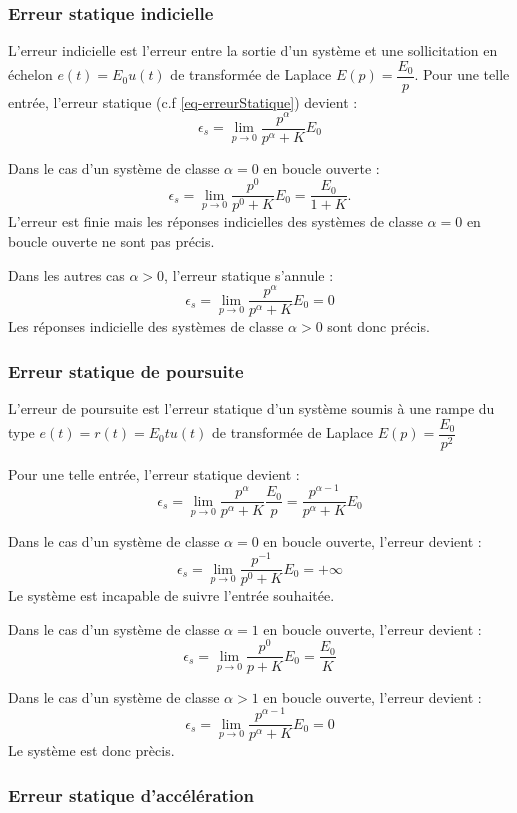 \subsubsection{Erreur statique indicielle}

L'erreur indicielle est l'erreur entre la sortie d'un système et une 
sollicitation en échelon $e(t)=E_0u(t)$ de transformée de Laplace 
$E(p)=\dfrac{E_0}{p}$. 
Pour une telle entrée, l'erreur statique (c.f \cref{eq-erreurStatique}) devient :
$$
\epsilon_s=\lim\limits_{p\to 0} \dfrac{p^\alpha}{p^\alpha+K}E_0
$$

Dans le cas d'un système de classe $\alpha=0$ en boucle ouverte :
$$
\epsilon_s=\lim\limits_{p\to 0} \dfrac{p^0}{p^0+K}E_0=\dfrac{E_0}{1+K}.
$$
L'erreur est finie mais les réponses indicielles des systèmes de classe 
$\alpha=0$ en boucle ouverte ne sont pas précis.

Dans les autres cas $\alpha>0$, l'erreur statique s'annule :
$$
\epsilon_s=\lim\limits_{p\to 0} \dfrac{p^\alpha}{p^\alpha+K}E_0=0
$$
Les réponses indicielle des systèmes de classe $\alpha>0$ sont donc précis.

\subsubsection{Erreur statique de poursuite}
L'erreur de poursuite est l'erreur statique d'un système soumis à une rampe 
du type $e(t)=r(t)=E_0t u(t)$
de transformée de Laplace $E(p)=\dfrac{E_0}{p^2}$

Pour une telle entrée, l'erreur statique devient :
$$
\epsilon_s=\lim\limits_{p\to 0} \dfrac{p^\alpha}{p^\alpha+K}\dfrac{E_0}{p}=\dfrac{p^{\alpha-1}}{p^\alpha+K}E_0 
$$

Dans le cas d'un système de classe $\alpha=0$ en boucle ouverte, l'erreur devient :
$$
\epsilon_s=\lim\limits_{p\to 0}\dfrac{p^{-1}}{p^0+K}E_0=+\infty
$$
Le système est incapable de suivre l'entrée souhaitée.

Dans le cas d'un système de classe $\alpha=1$ en boucle ouverte, l'erreur devient :
$$
\epsilon_s=\lim\limits_{p\to 0}\dfrac{p^0}{p+K}E_0=\dfrac{E_0}{K}
$$

Dans le cas d'un système de classe $\alpha>1$ en boucle ouverte, l'erreur devient :
$$
\epsilon_s=\lim\limits_{p\to 0}\dfrac{p^{\alpha-1}}{p^\alpha+K}E_0=0
$$
Le système est donc prècis.

\subsubsection{Erreur statique d'accélération}

